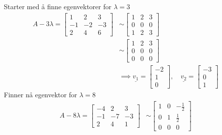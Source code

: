 \documentclass[11pt, a4paper, norsk]{NTNUoving}
\begin{document}
\begin{oppgave}
\begin{punkt}
            Starter med å finne egenvektorer for $\lambda = 3$
            \begin{align*}
                A - 3\lambda = \begin{bmatrix}
                    1 & 2 & 3 \\
                    -1 & -2 & -3 \\
                    2 & 4 & 6
                \end{bmatrix} &\sim \begin{bmatrix}
                1 & 2 & 3 \\
                0 & 0 & 0 \\
                1 & 2 & 3
                \end{bmatrix}
                \\
                &\sim \begin{bmatrix}
                    1 & 2 & 3 \\
                    0 & 0 & 0 \\
                    0 & 0 & 0
                \end{bmatrix}
                \\
                &\implies \underline{v_1} = \begin{bmatrix}
                    -2 \\
                    1 \\
                    0
                \end{bmatrix}, \quad \underline{v_2} = \begin{bmatrix}
                    -3 \\
                    0 \\
                    1
                \end{bmatrix}
            \end{align*}
            Finner nå egenvektor for $\lambda = 8$
            \begin{align*}
                A - 8\lambda = \begin{bmatrix}
                    -4 & 2 & 3 \\
                    -1 & -7 & -3 \\
                    2 & 4 & 1
                \end{bmatrix} &\sim \begin{bmatrix}
                1 & 0 & -\frac{1}{2} \\
                0 & 1 & \frac{1}{2} \\
                0 & 0 & 0
                \end{bmatrix}

\end{align*}
\end{punkt}
\end{oppgave}
\end{document}
